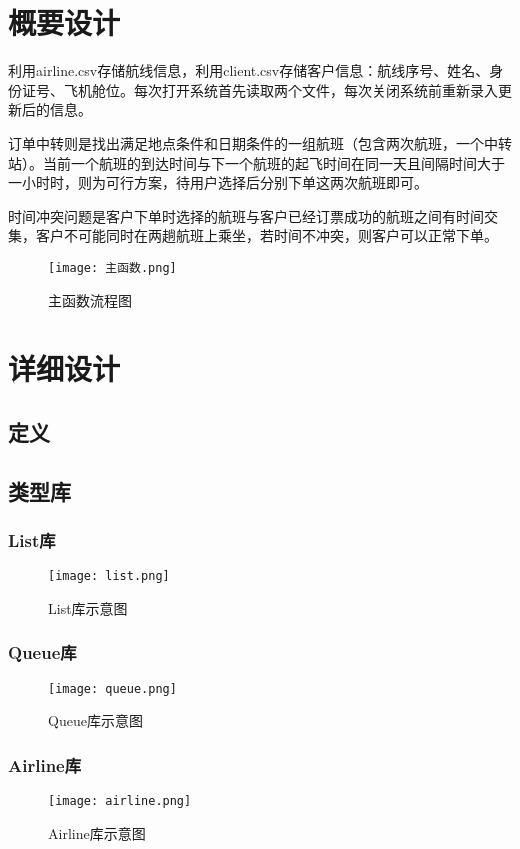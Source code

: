 \documentclass{DateStructure}
\begin{document}
\section{概要设计}
利用airline.csv存储航线信息，利用client.csv存储客户信息：航线序号、姓名、身份证号、飞机舱位。每次打开系统首先读取两个文件，每次关闭系统前重新录入更新后的信息。\par
订单中转则是找出满足地点条件和日期条件的一组航班（包含两次航班，一个中转站）。当前一个航班的到达时间与下一个航班的起飞时间在同一天且间隔时间大于一小时时，则为可行方案，待用户选择后分别下单这两次航班即可。\par
时间冲突问题是客户下单时选择的航班与客户已经订票成功的航班之间有时间交集，客户不可能同时在两趟航班上乘坐，若时间不冲突，则客户可以正常下单。\par
\begin{figure}[H] 
\centering
\texttt{[image: 主函数.png]}
\caption{主函数流程图}
\end{figure}

\section{详细设计}
\subsection{定义}
	
\subsection{类型库}
\subsubsection{List库}
\begin{figure}[H] 
\centering
\texttt{[image: list.png]}
\caption{List库示意图}	
\end{figure}

\subsubsection{Queue库}
\begin{figure}[H] 
\centering
\texttt{[image: queue.png]}
\caption{Queue库示意图}	
\end{figure}

\subsubsection{Airline库}
\begin{figure}[H] 
\centering
\texttt{[image: airline.png]}
\caption{Airline库示意图}
\end{figure}

\end{document}
